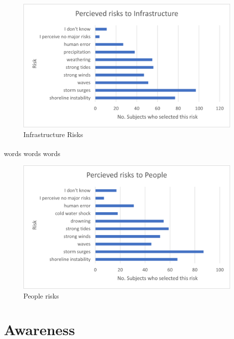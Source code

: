 \begin{figure}[h]
    \centering
    \includegraphics{fig_results/infrastructure-risks.png}
    \caption{Infrastructure Risks}
    \label{fig:my_label}
\end{figure}
\paragraph{}
words words words

\begin{figure}[h]
    \centering
    \includegraphics{fig_results/people-risks.png}
    \caption{People risks}
    \label{fig:my_label}
\end{figure}
\paragraph{}

\section{Awareness}

